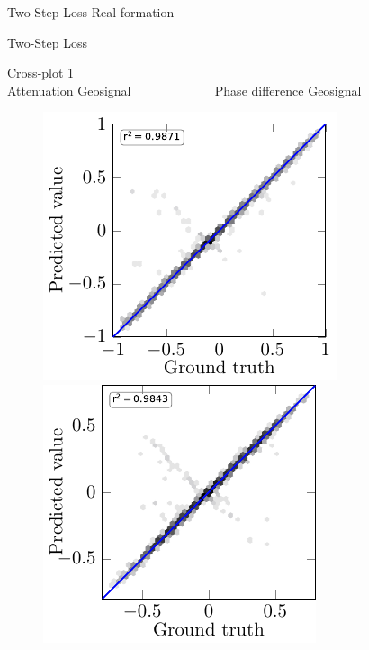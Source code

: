 \begin{frame}{Two-Step Loss}
Real formation
\begin{figure}[!h]
				\centering
\end{figure}
\vspace{-0.5cm}
Two-Step Loss
\begin{figure}[!h]
	\centering
\end{figure}
\end{frame}


\begin{frame}{Cross-plot 1}
\centering
\setlength{\fboxrule}{0.5mm}
\setlength{\fboxsep}{1mm}
\color{red}
\color{black}
$\qquad$ \\
\hspace{0.8cm} Attenuation Geosignal $\qquad \qquad \qquad$ Phase difference Geosignal
\begin{figure}[!h]
\centering
	{\includegraphics[scale=0.9]{Diapos/DL_For_Inv/Figures/Syn_example/Cross_plots/Two_Step_loss/C_P_1/atten_geo.pdf}%
		\hspace{2cm}
	\includegraphics[trim=0cm 0cm 0.3cm 0.25cm ,scale=0.9]{Diapos/DL_For_Inv/Figures/Syn_example/Cross_plots/Two_Step_loss/C_P_1/phase_geo.pdf}}	

\end{figure}
\end{frame}
